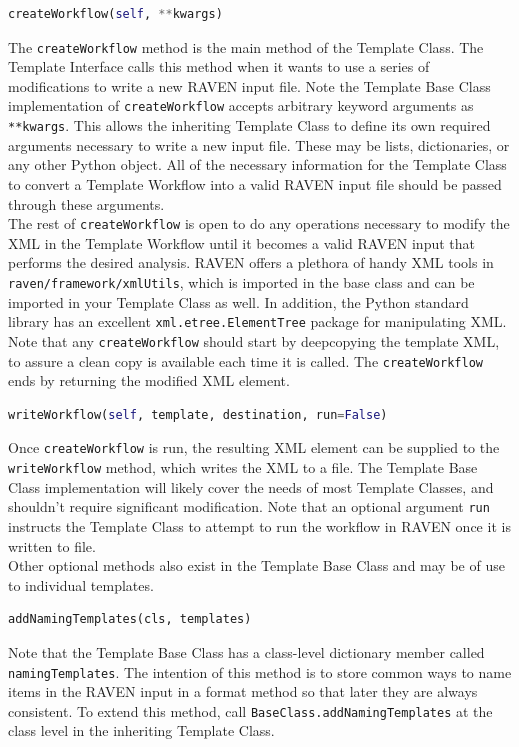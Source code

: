 \begin{lstlisting}[language=python]
 createWorkflow(self, **kwargs)
\end{lstlisting}
The \texttt{createWorkflow} method is the main method of the Template Class. The Template Interface calls this method when it wants to use a series of modifications to write a new RAVEN input file. Note the Template Base Class implementation of \texttt{createWorkflow} accepts arbitrary keyword arguments as \texttt{**kwargs}. This allows the inheriting Template Class to define its own required arguments necessary to write a new input file. These may be lists, dictionaries, or any other Python object. All of the necessary information for the Template Class to convert a Template Workflow into a valid RAVEN input file should be passed through these arguments.
\\

The rest of \texttt{createWorkflow} is open to do any operations necessary to modify the XML in the Template Workflow until it becomes a valid RAVEN input that performs the desired analysis. RAVEN offers a plethora of handy XML tools in
\texttt{raven/framework/xmlUtils}, which is imported in the base class and can be imported in your Template Class as well. In addition, the Python standard library has an excellent \texttt{xml.etree.ElementTree} package for manipulating XML.  Note that any \texttt{createWorkflow} should start by deepcopying the template XML, to assure a clean copy is available each time it is called. The \texttt{createWorkflow} ends by returning the modified XML element.

\begin{lstlisting}[language=python]
 writeWorkflow(self, template, destination, run=False)
\end{lstlisting}
Once \texttt{createWorkflow} is run, the resulting XML element can be supplied to the \texttt{writeWorkflow} method, which writes the XML to a file. The Template Base Class implementation will likely cover the needs of most Template Classes, and shouldn't require significant modification. Note that an optional argument \texttt{run} instructs the Template Class to attempt to run the workflow in RAVEN once it is written to file.
\\

Other optional methods also exist in the Template Base Class and may be of use to individual templates.
\begin{lstlisting}[language=python]
 addNamingTemplates(cls, templates)
\end{lstlisting}
Note that the Template Base Class has a class-level dictionary member called \texttt{namingTemplates}. The intention of this method is to store common ways to name items in the RAVEN input in a format method so that later they are always consistent. To extend this method, call \texttt{BaseClass.addNamingTemplates} at the class level in the inheriting Template Class.
\\


